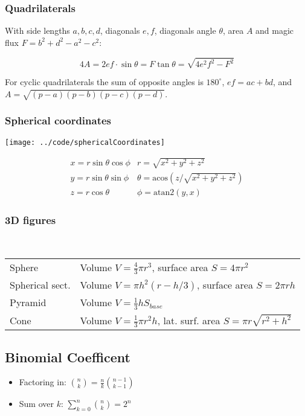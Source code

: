 {\subsubsection{Quadrilaterals}
With side lengths $a,b,c,d$, diagonals $e, f$, diagonals angle $\theta$, area $A$ and
magic flux $F=b^2+d^2-a^2-c^2$:

\[ 4A = 2ef \cdot \sin\theta = F\tan\theta = \sqrt{4e^2f^2-F^2} \]

 For cyclic quadrilaterals the sum of opposite angles is $180^\circ$,
$ef = ac + bd$, and $A = \sqrt{(p-a)(p-b)(p-c)(p-d)}$.

\subsubsection{Spherical coordinates}
\centerline{\texttt{[image: ../code/sphericalCoordinates]}}
\[\begin{array}{cc}
x = r\sin\theta\cos\phi & r = \sqrt{x^2+y^2+z^2}\\
y = r\sin\theta\sin\phi & \theta = \textrm{acos}(z/\sqrt{x^2+y^2+z^2})\\
z = r\cos\theta & \phi = \textrm{atan2}(y,x)
\end{array}\]

\subsubsection{3D figures} \\
\begin{tabular}{ll}
  Sphere & Volume $V=\frac{4}{3} \pi r^3$, surface area $S=4 \pi r^2$ \\
  Spherical sect. &
    Volume $V = \pi h^2 (r - h/3)$,
	surface area $S = 2 \pi r h$ \\
  Pyramid &
    Volume $V=\frac{1}{3} h S_{base}$ \\
  Cone &
    Volume $V=\frac{1}{3} \pi r^2 h$,
    lat. surf. area $S = \pi r \sqrt{r^2+h^2}$
\end{tabular}

\subsection{Binomial Coefficent}

\begin{itemize}[leftmargin=*, noitemsep]
  \item Factoring in: \( \binom{n}{k} = \frac{n}{k} \binom{n - 1}{k - 1} \)

  \item Sum over \( k \): \( \sum_{k = 0}^n \binom{n}{k} = 2^n \)


\end{itemize}}
